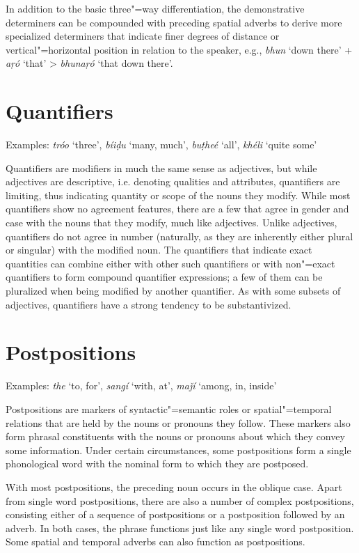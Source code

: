 In addition to the basic three"=way differentiation, the demonstrative determiners can be compounded with preceding spatial adverbs to derive more specialized determiners that  indicate finer degrees of distance or vertical"=horizontal position in relation to the speaker, e.g., \textit{bhun} `down there' + \textit{aṛó} `that' > \textit{bhunaṛó} `that down there'.


\section{Quantifiers}
\label{sec:3b-8}
Examples: \textit{tróo} `three', \textit{bíiḍu} `many, much', \textit{buṭheé} `all', \textit{khéli} `quite some'


Quantifiers are modifiers in much the same sense as adjectives, but while adjectives are descriptive, i.e. denoting qualities and attributes, quantifiers are limiting, thus indicating quantity or scope of the nouns they modify. While most quantifiers show no agreement features, there are a few that agree in gender and case with the nouns that they modify, much like adjectives. Unlike adjectives, quantifiers do not agree in number (naturally, as they are inherently either plural or singular) with the modified noun. The quantifiers that indicate exact quantities can combine either with other such quantifiers or with non"=exact quantifiers to form compound quantifier expressions; a few of them can be pluralized when being modified by another quantifier. As with some subsets of adjectives, quantifiers have a strong tendency to be substantivized.


\section{Postpositions}
\label{sec:3b-9}
Examples: \textit{the} `to, for', \textit{sangí} `with, at', \textit{maǰí} `among, in, inside'


Postpositions are markers of syntactic"=semantic roles or spatial"=temporal relations that are held by the nouns or pronouns they follow. These markers also form phrasal constituents with the nouns or pronouns about which they convey some information. Under certain circumstances, some postpositions form a single phonological word with the nominal form to which they are postposed.  


With most postpositions, the preceding noun occurs in the oblique case. Apart from single word postpositions, there are also a number of complex postpositions, consisting either of a sequence of postpositions or a postposition followed by an adverb. In both cases, the phrase functions just like any single word postposition. Some spatial and temporal adverbs can also function as postpositions.


